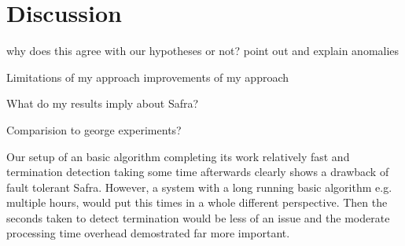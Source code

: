 \section{Discussion}

why does this agree with our hypotheses or not?
  point out and explain anomalies
  
Limitations of my approach
  improvements of my approach
  
What do my results imply about Safra?
  
  
  
Comparision to george experiments?

Our setup of an basic algorithm completing its work relatively fast and termination detection taking some time afterwards clearly shows a drawback of fault tolerant Safra.
However, a system with a long running basic algorithm e.g. multiple hours, would put this times in a whole different perspective.
Then the seconds taken to detect termination would be less of an issue and the moderate processing time overhead demostrated far more important.
